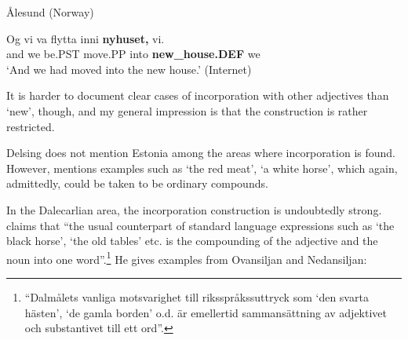 \item 

Ålesund (Norway)



 \ea\label{}
\gll Og  vi  va  flytta  inni  \textbf{nyhuset,} vi.  \\


and  we  be.PST  move.PP  into  \textbf{new\_house.DEF} we  \\

\glt ‘And we had moved into the new house.’ (Internet)

\z

It is harder to document clear cases of incorporation with other adjectives than  ‘new’, though, and my general impression is that the construction is rather restricted.


Delsing does not mention Estonia among the areas where incorporation is found. However, \citet[98]{Tiberg1962} mentions examples such as  ‘the red meat’,  ‘a white horse’, which again, admittedly, could be taken to be ordinary compounds.


In the Dalecarlian area, the incorporation construction is undoubtedly strong. \citet[148]{Levander1928} claims that “the usual counterpart of standard language expressions such as ‘the black horse’, ‘the old tables’ etc. is the compounding of the adjective and the noun into one word”.\footnote{ “Dalmålets vanliga motsvarighet till riksspråkssuttryck som ‘den svarta hästen’, ‘de gamla borden’ o.d. är emellertid sammansättning av adjektivet och substantivet till ett ord”.} He gives examples from Ovansiljan and Nedansiljan: 


\item 

